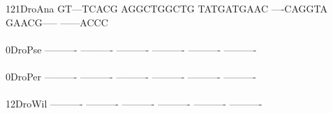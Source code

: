 \documentclass[11pt,twoside,reqno,a4paper]{article}
\begin{document}
{121\hspace*{2\charwidth}DroAna	GT---TCACG	AGGCTGGCTG	TATGATGAAC	----CAGGTA	GAACG-----	------ACCC	\\
\hspace*{5\charwidth}\hspace*{7\charwidth}\hspace*{1\charwidth}\hspace*{1\charwidth}\hspace*{1\charwidth}\hspace*{1\charwidth}\hspace*{1\charwidth}\hspace*{1\charwidth}\\
0\hspace*{4\charwidth}DroPse	----------	----------	----------	----------	----------	----------	\\
\hspace*{5\charwidth}\hspace*{7\charwidth}\hspace*{1\charwidth}\hspace*{1\charwidth}\hspace*{1\charwidth}\hspace*{1\charwidth}\hspace*{1\charwidth}\hspace*{1\charwidth}\\
0\hspace*{4\charwidth}DroPer	----------	----------	----------	----------	----------	----------	\\
\hspace*{5\charwidth}\hspace*{7\charwidth}\hspace*{1\charwidth}\hspace*{1\charwidth}\hspace*{1\charwidth}\hspace*{1\charwidth}\hspace*{1\charwidth}\hspace*{1\charwidth}\\
12\hspace*{3\charwidth}DroWil	----------	----------	----------	----------	----------	----------	\\
\hspace*{5\charwidth}\hspace*{7\charwidth}\hspace*{1\charwidth}\hspace*{1\charwidth}\hspace*{1\charwidth}\hspace*{1\charwidth}\hspace*{1\charwidth}\hspace*{1\charwidth}\\
}
\end{document}
